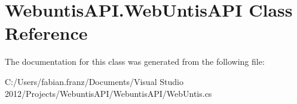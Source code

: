 \hypertarget{class_webuntis_a_p_i_1_1_web_untis_a_p_i}{\section{Webuntis\-A\-P\-I.\-Web\-Untis\-A\-P\-I Class Reference}
\label{class_webuntis_a_p_i_1_1_web_untis_a_p_i}
}


The documentation for this class was generated from the following file\-:\begin{DoxyCompactItemize}
\item 
C\-:/\-Users/fabian.\-franz/\-Documents/\-Visual Studio 2012/\-Projects/\-Webuntis\-A\-P\-I/\-Webuntis\-A\-P\-I/Web\-Untis.\-cs\end{DoxyCompactItemize}
